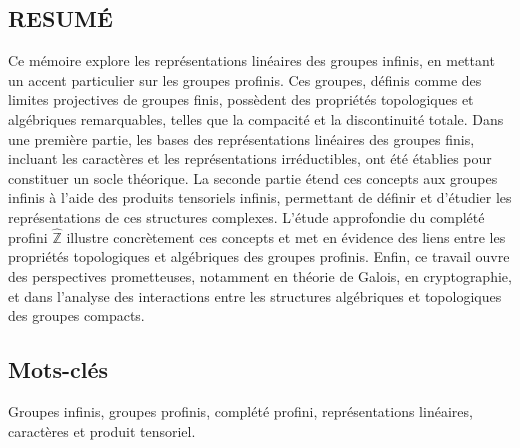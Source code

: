 \documentclass[a4paper, 14pt]{report}
\newcommand{\applyfontsize}{%
	\fontsize{12}{12}\selectfont
}
\begin{document}
\begin{onehalfspace}
		\chapter*{RESUMÉ}
		{
			\applyfontsize %
			Ce mémoire explore les représentations linéaires des groupes infinis, en mettant un accent particulier sur les groupes profinis. Ces groupes, définis comme des limites projectives de groupes finis, possèdent des propriétés topologiques et algébriques remarquables, telles que la compacité et la discontinuité totale. Dans une première partie, les bases des représentations linéaires des groupes finis, incluant les caractères et les représentations irréductibles, ont été établies pour constituer un socle théorique. La seconde partie étend ces concepts aux groupes infinis à l’aide des produits tensoriels infinis, permettant de définir et d’étudier les représentations de ces structures complexes. L’étude approfondie du complété profini \( \widehat{\mathbb{Z}} \) illustre concrètement ces concepts et met en évidence des liens entre les propriétés topologiques et algébriques des groupes profinis. Enfin, ce travail ouvre des perspectives prometteuses, notamment en théorie de Galois, en cryptographie, et dans l’analyse des interactions entre les structures algébriques et topologiques des groupes compacts.
			
			
			\section*{Mots-clés}
			Groupes infinis, groupes profinis, complété profini, représentations linéaires, caractères et produit tensoriel.
			
		}
		
		

\end{onehalfspace}
\end{document}
